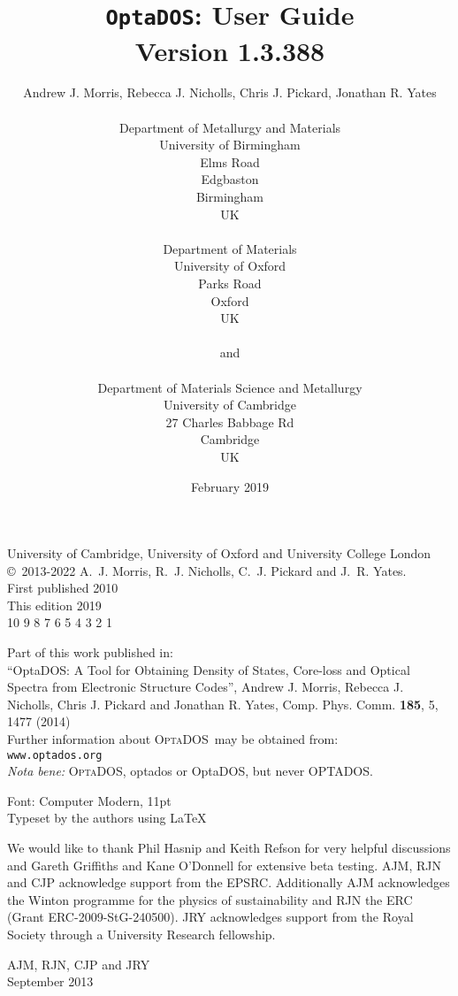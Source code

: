 \documentclass[a4paper,11pt,twoside]{book}
\title{{\huge {\tt OptaDOS}: User Guide}\\ {Version 1.3.388}}
\author{Andrew J. Morris, Rebecca J. Nicholls, Chris J. Pickard, Jonathan R. Yates \\
\\
Department of Metallurgy and Materials\\
University of Birmingham \\
Elms Road\\
Edgbaston\\
Birmingham\\
UK\\
\\
Department of Materials\\
University of Oxford\\
Parks Road\\
Oxford\\
UK \\
\\
{\small and} \\
\\
Department of Materials Science and Metallurgy\\
University of Cambridge\\
27 Charles Babbage Rd\\
Cambridge\\
UK\\
}
\date{February 2019}
\begin{document}
\newcommand{\optados}{\textsc{OptaDOS}}
\newcommand{\lindos}{\texttt{LinDOS}}
\newcommand{\onetep}{\textsc{onetep}}
\newcommand{\castep}{\textsc{castep}}
\maketitle

 \thispagestyle{empty}

\begin{centering}
\vspace*{40mm}
University of Cambridge, University of Oxford and University College London\\
\vspace{5mm}
\copyright\ 2013-2022 A.~J. Morris, R.~J. Nicholls, C.~J. Pickard and J.~R. Yates.\\
\vspace{5mm}
First published 2010\\
This edition 2019\\
\vspace{5mm}
10 9 8 7 6 5 4 3 2 1
\vspace{5mm}

Part of this work published in:\\
``OptaDOS: A Tool for Obtaining Density of States, Core-loss and Optical Spectra from Electronic Structure Codes'', Andrew J. Morris, Rebecca J. Nicholls, Chris J. Pickard and Jonathan R. Yates, Comp. Phys. Comm. {\bf 185}, 5, 1477 (2014)\\
\vspace{10mm}
Further information about \optados\ may be obtained from:\\ \texttt{www.optados.org}\\

\vspace{10mm}
\emph{Nota bene:} \optados, optados or OptaDOS, but never OPTADOS.

\null\vfill
\noindent
Font: Computer Modern, 11pt\\
Typeset by the authors using \LaTeX\, \\
\end{centering}
\newpage

\setcounter{tocdepth}{1}
\tableofcontents

\newpage
 \thispagestyle{empty}
\vspace*{50mm}
\begin{centering}
We would like to thank Phil Hasnip and Keith Refson for very helpful discussions and Gareth Griffiths and Kane O'Donnell for extensive beta testing.
 AJM, RJN and CJP acknowledge support from the EPSRC. Additionally AJM acknowledges
the Winton programme for the physics of sustainability and RJN the ERC
(Grant ERC-2009-StG-240500).
 JRY acknowledges support from the Royal Society through a University Research fellowship.
\end{centering}
\begin{flushright}
AJM, RJN, CJP and JRY\\
September 2013
\end{flushright}
\end{document}
